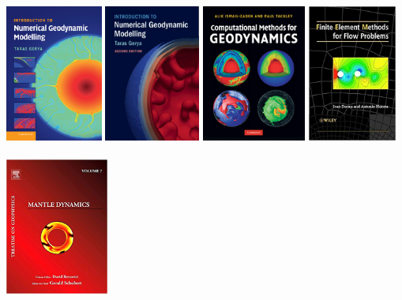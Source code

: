 
\begin{center}
\includegraphics[height=4.5cm]{images/literature/gerya_book}
\includegraphics[height=4.5cm]{images/literature/gerya_book2}
\includegraphics[height=4.5cm]{images/literature/tackley_book}
\includegraphics[height=4.5cm]{images/literature/donea_huerta_book}\\
\cite{gery10} \hspace{1.99cm} 
\cite{gery19book} \hspace{1.99cm} 
\cite{tack10} \hspace{1.99cm} 
\cite{dohu03}  \\
\includegraphics[height=4.5cm]{images/literature/bercovici_book}

\end{center}
